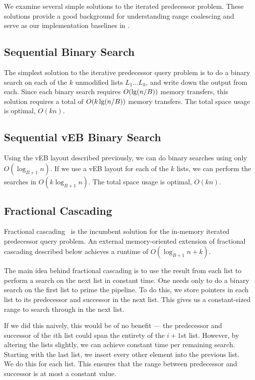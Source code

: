 We examine several simple solutions to the iterated predecessor problem. 
These solutions provide a good background for understanding range coalescing and
serve as our implementation baselines in .

\subsection*{Sequential Binary Search}
The simplest solution to the iterative predecessor query problem 
is to do a binary search on each of the $k$ unmodified lists 
$L_1 \ldots L_k$, and write 
down the output from each. Since each binary search requires $O(\lg \mathopen{}\left(n/B\right)\mathclose{})$ memory transfers, 
this solution requires a total of $O(k \lg \mathopen{}\left(n/B\right)\mathclose{})$ memory transfers. The total space 
usage is optimal, $O(kn)$.

\subsection*{Sequential vEB Binary Search}
Using the vEB layout described previously, we can do binary searches using only 
$O(\log_{B+1} n)$. If we use a vEB layout for each of the $k$ lists, we can perform 
the searches in $O(k \log_{B+1} n)$. The total space usage is optimal, $O(kn)$.

\subsection*{Fractional Cascading}
Fractional cascading~\cite{ChazelleGu86a} is the incumbent solution for the in-memory iterated 
predecessor query problem. An external memory-oriented extension of fractional cascading
described below achieves a runtime of $O(\log_{B+1} n + k)$.

The main idea behind fractional cascading is to use the result from 
each list to perform a search on the next list in 
constant time.  One needs only to do a binary search on the first list to prime the
pipeline.  To do this, we store pointers in each list to its predecessor and 
successor in the next list. This gives us a constant-sized range to 
search through in the next list.

If we did this naively, this would be of no benefit --- the predecessor and 
successor of the $i$th list could span the entirety of the $i+1$st list. 
However, by altering the lists slightly, 
we can achieve constant time per remaining search. Starting with the last list, 
we insert every other element into the previous list. We do this for each list. 
This ensures that the range between predecessor and successor is at most a constant value.

